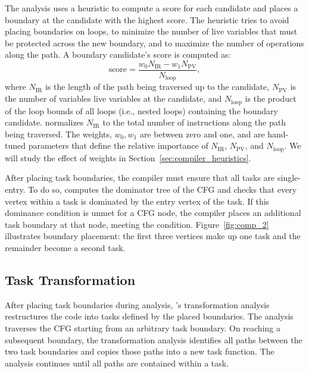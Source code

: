 The analysis uses a heuristic to compute a score for each candidate and places
a boundary at the candidate with the highest score. The heuristic tries to
avoid placing boundaries on loops, to minimize the number of live variables
that must be protected across the new boundary, and to maximize the number of
operations along the path.  A boundary candidate's score is computed as:
%
\begin{equation}
\text{score} = \frac{w_{0} N_{\text{IR}} - w_{1} N_{\text{PV}}}{N_{\text{loop}}},\nonumber
\end{equation}
%
where $N_{\text{IR}}$ is the length of the path being traversed up to the
candidate, $N_{\text{PV}}$ is the number of variables live variables at the
candidate, and $N_{\text{loop}}$ is the product of the loop bounds of all loops
(i.e., nested loops) containing the boundary candidate. \sys normalizes $N_{\text{IR}}$ to the
total number of instructions along the path being traversed. The weights, $w_{0},
w_{1}$ are between zero and one, and are hand-tuned parameters that define the
relative importance of $N_{\text{IR}}$, $N_{\text{PV}}$, and $N_{\text{loop}}$.
We will study the effect of weights in Section~\ref{sec:compiler_heuristics}. 

After placing task boundaries, the compiler must ensure that all tasks are
single-entry.  To do so, \sys computes the dominator tree of the CFG and checks
that every vertex within a task is dominated by the entry vertex of the task.
If this dominance condition is unmet for a CFG node, the compiler places
an additional task boundary at that node, meeting the condition.
%
Figure~\ref{fig:comp_2} illustrates boundary placement: the first three
vertices make up one task and the remainder become a second task.



\subsection{Task Transformation}
\label{sec:compiler_transform_pass}


After placing task boundaries during analysis, \sys's transformation analysis
restructures the code into tasks defined by the placed boundaries. The analysis
traverses the CFG starting from an arbitrary task boundary.  On reaching a
subsequent boundary, the transformation analysis identifies all paths between
the two task boundaries and copies those paths into a new task function.  The
analysis continues until all paths are contained within a task. 

